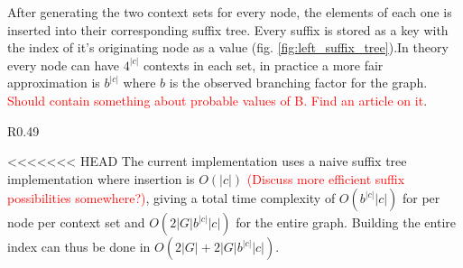 \documentclass{article}
\begin{document}
After generating the two context sets for every node, the elements of each one is inserted into their corresponding suffix tree. Every suffix is stored as a key with the index of it's originating node as a value (fig. \ref{fig:left_suffix_tree}).In theory every node can have $4^{|c|}$ contexts in each set, in practice a more fair approximation is $b^{|c|}$ where $b$ is the observed branching factor for the graph. \textcolor{red}{Should contain something about probable values of B. Find an article on it}. 
\begin{wrapfigure}{R}{0.49\textwidth}
  \begin{mdframed}
  \end{mdframed}
  \caption{The left suffix tree corresponding to the graph in \ref{fig:explicit_contexts}}
  \label{fig:left_suffix_tree}
\end{wrapfigure}
<<<<<<< HEAD
The current implementation uses a naive suffix tree implementation where insertion is $O(|c|)$ \textcolor{red}{(Discuss more efficient suffix possibilities somewhere?)}, giving a total time complexity of $O(b^{|c|}|c|)$ for per node per context set and $O(2|G|b^{|c|}|c|)$ for the entire graph. Building the entire index can thus be done in $O(2|G| + 2|G|b^{|c|}|c|)$.
\end{document}
